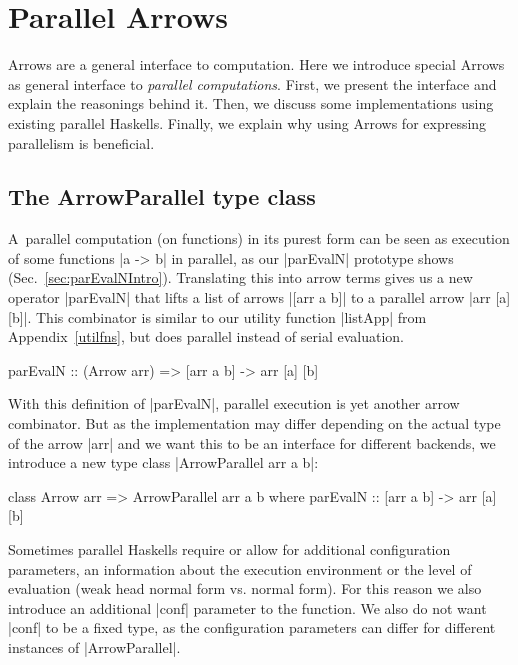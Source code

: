 \section{Parallel Arrows}
\label{sec:parallel-arrows}
Arrows are a general interface to computation. Here we introduce special Arrows as general interface to \textit{parallel computations}. First, we present the interface and explain the reasonings behind it. Then, we discuss some implementations using existing parallel Haskells. Finally, we explain why using Arrows for expressing parallelism is beneficial.
\subsection{The ArrowParallel type class}
A~parallel computation (on functions) in its purest form can be seen as execution of some functions |a -> b| in parallel, as our |parEvalN| prototype shows (Sec.~\ref{sec:parEvalNIntro}).
Translating this into arrow terms gives us a new operator |parEvalN| that lifts a list of arrows |[arr a b]| to a parallel arrow |arr [a] [b]|. %
This combinator is similar to our utility function |listApp| from Appendix~\ref{utilfns}, but does parallel instead of serial evaluation.
\begin{code}
parEvalN :: (Arrow arr) => [arr a b] -> arr [a] [b]
\end{code}
With this definition of |parEvalN|, parallel execution is yet another arrow combinator. But as the implementation may differ depending on the actual type of the arrow |arr| and we want this to be an interface for different backends, we introduce a new type class |ArrowParallel arr a b|: %
\begin{code}
class Arrow arr => ArrowParallel arr a b where
	parEvalN :: [arr a b] -> arr [a] [b]
\end{code}
Sometimes parallel Haskells require or allow for additional configuration parameters, \eg an information about the execution environment or the level of evaluation (weak head normal form vs. normal form). For this reason we also introduce an additional |conf| parameter to the function. We also do not want |conf| to be a fixed type, as the configuration parameters can differ for different instances of |ArrowParallel|. %
